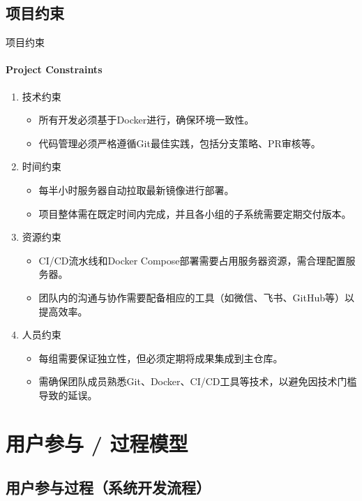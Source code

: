 \documentclass{beamer}
\begin{document}

\subsection{项目约束}

\begin{frame}[fragile]{项目约束}
\framesubtitle{Project Constraints}
\begin{enumerate}
\item 技术约束
\begin{itemize}
\item 所有开发必须基于Docker进行，确保环境一致性。
\item 代码管理必须严格遵循Git最佳实践，包括分支策略、PR审核等。
\end{itemize}
\item 时间约束
\begin{itemize}
\item 每半小时服务器自动拉取最新镜像进行部署。
\item 项目整体需在既定时间内完成，并且各小组的子系统需要定期交付版本。
\end{itemize}
\item 资源约束
\begin{itemize}
\item CI/CD流水线和Docker Compose部署需要占用服务器资源，需合理配置服务器。
\item 团队内的沟通与协作需要配备相应的工具（如微信、飞书、GitHub等）以提高效率。
\end{itemize}
\item 人员约束
\begin{itemize}
\item 每组需要保证独立性，但必须定期将成果集成到主仓库。
\item 需确保团队成员熟悉Git、Docker、CI/CD工具等技术，以避免因技术门槛导致的延误。
\end{itemize}
\end{enumerate}
\end{frame}


\section{用户参与 / 过程模型}


\subsection{用户参与过程（系统开发流程）}
\end{document}
